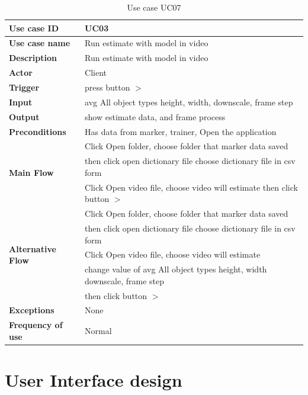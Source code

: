 \begin{table}[H]
  \begin{center}
    \begin{tabular}{ | l | l |} 
    \hline
    \textbf{Use case ID} & UC03 \\
    \hline
    \textbf{Use case name} & Run estimate with model in video \\
    \hline
    \textbf{Description} & Run estimate with model in video\\
    \hline
    \textbf{Actor} & Client \\
    \hline
    \textbf{Trigger} & press button $>$\\
    \hline
    \textbf{Input} & avg All object types height, width, downscale, frame step  \\
    \hline
    \textbf{Output} & show estimate data, and frame process \\
    \hline    
    \textbf{Preconditions} & Has data from marker, trainer, Open the application \\
    \hline
    \multirow{3}{4em}{\textbf{Main Flow}}  & Click Open folder, choose folder that marker data saved\\
    & then click open dictionary file choose dictionary file in csv form \\
    & Click Open video file, choose video will estimate then click button $>$\\
    \hline
    \multirow{5}{4em}{\textbf{Alternative Flow}} & Click Open folder, choose folder that marker data saved\\
    & then click open dictionary file choose dictionary file in csv form \\
    & Click Open video file, choose video will estimate\\ 
    & change value of avg All object types height, width downscale, frame step\\
    & then click button $>$\\
    \hline
    \textbf{Exceptions} & None \\
    \hline
    \textbf{Frequency of use} & Normal \\
    \hline
    \end{tabular}
  \end{center}
  \caption{Use case UC07}\label{tab:uc7}
\end{table}



\section{User Interface design}

